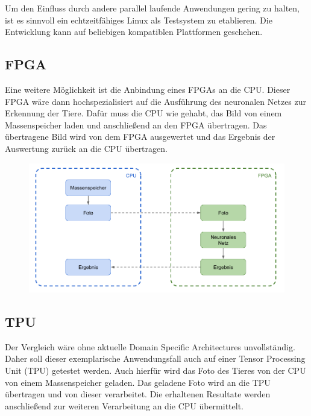 Um den Einfluss durch andere parallel laufende Anwendungen gering zu halten, ist es sinnvoll ein echtzeitfähiges Linux als Testsystem zu etablieren. Die Entwicklung kann auf beliebigen kompatiblen Plattformen geschehen.

\newpage


\subsection{FPGA}

Eine weitere Möglichkeit ist die Anbindung eines FPGAs an die CPU. Dieser FPGA wäre dann hochspezialisiert auf die Ausführung des neuronalen Netzes zur Erkennung der Tiere. Dafür muss die CPU wie gehabt, das Bild von einem Massenspeicher laden und anschließend an den FPGA übertragen. Das übertragene Bild wird von dem FPGA ausgewertet und das Ergebnis der Auswertung zurück an die CPU übertragen. 

\begin{figure}[htbp]
	\centering
		\includegraphics[width=1.00\textwidth]{BilderPDF/zielsetzung/System-FPGA.png}
	\label{fig:System-FPGA}
\end{figure}

\newpage


\subsection{TPU}

Der Vergleich wäre ohne aktuelle Domain Specific Architectures unvollständig. Daher soll dieser exemplarische Anwendungsfall auch auf einer Tensor Processing Unit (TPU) getestet werden. Auch hierfür wird das Foto des Tieres von der CPU von einem Massenspeicher geladen. Das geladene Foto wird an die TPU übertragen und von dieser verarbeitet. Die erhaltenen Resultate werden anschließend zur weiteren Verarbeitung an die CPU übermittelt.

